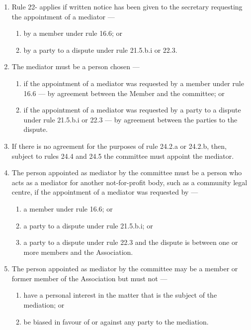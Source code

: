 \begin{enumerate}

\item Rule 22- applies if written notice has been given to the secretary requesting the appointment of a mediator ---

  \begin{enumerate}
  
  \item by a member under rule 16.6; or
  \item by a party to a dispute under rule 21.5.b.i or 22.3.
  \end{enumerate}
\item The mediator must be a person chosen ---

  \begin{enumerate}
  
  \item if the appointment of a mediator was requested by a member under rule 16.6 --- by agreement between the Member and the committee; or
  \item if the appointment of a mediator was requested by a party to a dispute under rule 21.5.b.i or 22.3 --- by agreement between the parties to the dispute.
  \end{enumerate}
\item If there is no agreement for the purposes of rule 24.2.a or 24.2.b, then, subject to rules 24.4 and 24.5 the committee must appoint the mediator.
\item The person appointed as mediator by the committee must be a person who acts as a mediator for another not-for-profit body, such as a community legal centre, if the appointment of a mediator was requested by ---

  \begin{enumerate}
  
  \item a member under rule 16.6; or
  \item a party to a dispute under rule 21.5.b.i; or
  \item a party to a dispute under rule 22.3 and the dispute is between one or more members and the Association.
  \end{enumerate}
\item The person appointed as mediator by the committee may be a member or former member of the Association but must not ---

  \begin{enumerate}
  
  \item have a personal interest in the matter that is the subject of the mediation; or
  \item be biased in favour of or against any party to the mediation.
  \end{enumerate}
\end{enumerate}

